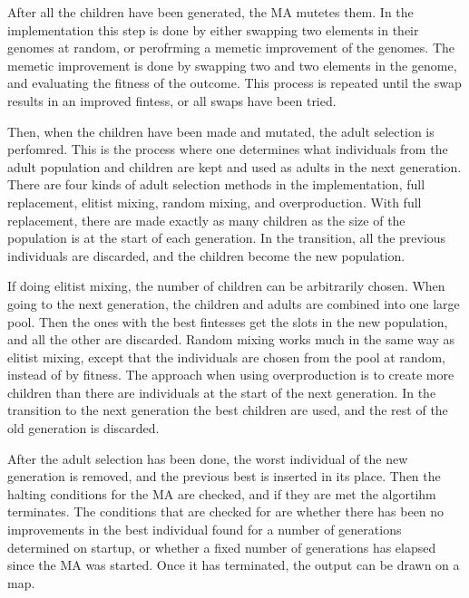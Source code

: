 After all the children have been generated, the MA mutetes them. In the implementation this step is done by either swapping two elements in their genomes at random, or perofrming a memetic improvement of the genomes. The memetic improvement is done by swapping two and two elements in the genome, and evaluating the fitness of the outcome. This process is repeated until the swap results in an improved fintess, or all swaps have been tried.

Then, when the children have been made and mutated, the adult selection is perfomred. This is the process where one determines what individuals from the adult population and children are kept and used as adults in the next generation. There are four kinds of adult selection methods in the implementation, full replacement, elitist mixing, random mixing, and overproduction. With full replacement, there are made exactly as many children as the size of the population is at the start of each generation. In the transition, all the previous individuals are discarded, and the children become the new population.

If doing elitist mixing, the number of children can be arbitrarily chosen. When going to the next generation, the children and adults are combined into one large pool. Then the ones with the best fintesses get the slots in the new population, and all the other are discarded. Random mixing works much in the same way as elitist mixing, except that the individuals are chosen from the pool at random, instead of by fitness. The approach when using overproduction is to create more children than there are individuals at the start of the next generation. In the transition to the next generation the best children are used, and the rest of the old generation is discarded.

After the adult selection has been done, the worst individual of the new generation is removed, and the previous best is inserted in its place. Then the halting conditions for the MA are checked, and if they are met the algortihm terminates. The conditions that are checked for are whether there has been no improvements in the best individual found for a number of generations determined on startup, or whether a fixed number of generations has elapsed since the MA was started. Once it has terminated, the output can be drawn on a map.




